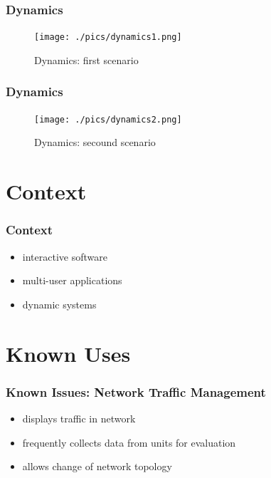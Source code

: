 \documentclass{beamer}
\begin{document}
\begin{frame}
 \frametitle{Dynamics}
 
\begin{figure}
 \centering
 \texttt{[image: ./pics/dynamics1.png]}
 \caption[Cap]{Dynamics: first scenario\endnotemark[1]}
 \label{abb:dyn1}
\end{figure}
 
\end{frame}

\begin{frame}
 \frametitle{Dynamics}

 \begin{figure}
 \centering
 \texttt{[image: ./pics/dynamics2.png]}
 \caption[Cap]{Dynamics: secound scenario\endnotemark[1]}
 \label{abb:dyn2}
\end{figure}
 
\end{frame}

\section{Context}
\begin{frame}
 \frametitle{Context}
 \begin{itemize}
  \item interactive software
  \item multi-user applications
  \item dynamic systems
 \end{itemize}
 

\end{frame}


\section{Known Uses}


\begin{frame}
 \frametitle{Known Issues: Network Traffic Management}
 
 \begin{itemize}
  \item displays traffic in network
  \item frequently collects data from units for evaluation
  \item allows change of network topology
 \end{itemize}

 
 

\end{frame}
\end{document}
